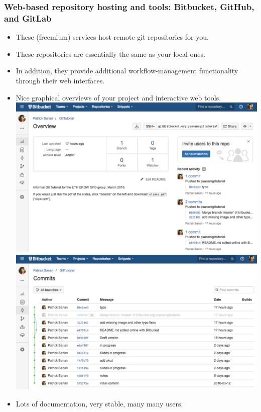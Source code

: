 \begin{frame}[fragile]
\frametitle{Web-based repository hosting and tools: Bitbucket, GitHub, and GitLab}
\begin{itemize}
\item These (freemium) services host remote git repositories for you.
\item These repositories are essentially the same as your local ones.
\item In addition, they provide additional workflow-management functionality through their web interfaces.
\item Nice graphical overviews of your project and interactive web tools.
\includegraphics[scale=0.15]{bitbucket2}
\includegraphics[scale=0.15]{bitbucket3}
\item Lots of documentation, very stable, many many users.
\end{itemize}
\end{frame}

